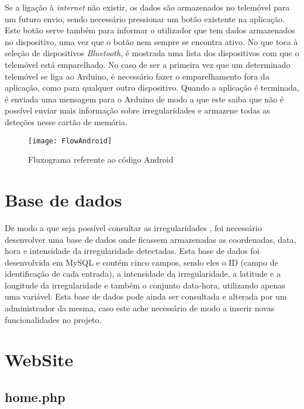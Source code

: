 Se a ligação à \emph{internet} não existir, os dados são armazenados no telemóvel para um futuro envio, sendo necessário pressionar um botão existente na aplicação.
Este botão serve também para informar o utilizador que tem dados armazenados no dispositivo, uma vez que o botão nem sempre se encontra ativo.
No que toca à seleção de dispositivos \emph{Bluetooth}, é mostrada uma lista dos dispositivos com que o telemóvel está emparelhado.
No caso de ser a primeira vez que um determinado telemóvel se liga ao Arduino, é necessário fazer o emparelhamento fora da aplicação, como para qualquer outro dispositivo.
Quando a aplicação é terminada, é enviada uma mensagem para o Arduino de modo a que este saiba que não é possível enviar mais informação sobre irregularidades e armazene todas as deteções nesse cartão de memória.

\begin{figure}[hbtp]
	\centering
	\texttt{[image: FlowAndroid]}
	\caption{Fluxograma referente ao código Android}
	\label{fig:Fluxograma_referente_ao_código_android}
\end{figure}

\newpage

\section{Base de dados}
\label{sec:Base_de_dados}

De modo a que seja possível consultar as irregularidades , foi necessário desenvolver uma base de dados onde ficassem armazenadas as coordenadas, data, hora e intensidade da irregularidade detectadas.
Esta base de dados foi desenvolvida em MySQL e contém cinco campos, sendo eles o ID (campo de identificação de cada entrada), a intensidade da irregularidade, a latitude e a longitude da irregularidade e também o conjunto data-hora, utilizando apenas uma variável.
Esta base de dados pode ainda ser consultada e alterada por um administrador da mesma, caso este ache necessário de modo a inserir novas funcionalidades no projeto.

\section{WebSite}
\label{sec:website}

\subsection{home.php}
\label{sub:home.php}

